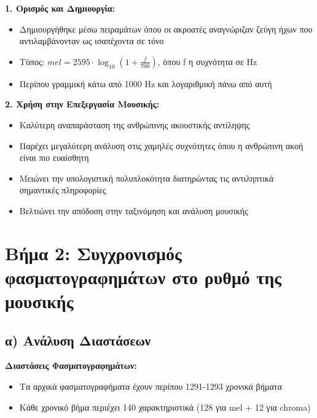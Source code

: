 \documentclass[a4paper,12pt]{article}
\begin{document}
\textbf{1. Ορισμός και Δημιουργία:}
\begin{itemize}
    \item Δημιουργήθηκε μέσω πειραμάτων όπου οι ακροατές αναγνώριζαν ζεύγη ήχων που αντιλαμβάνονταν ως ισαπέχοντα σε τόνο
    \item Τύπος: $mel = 2595 \cdot \log_{10}(1 + \frac{f}{700})$, όπου f η συχνότητα σε Hz
    \item Περίπου γραμμική κάτω από 1000 Hz και λογαριθμική πάνω από αυτή
\end{itemize}

\textbf{2. Χρήση στην Επεξεργασία Μουσικής:}
\begin{itemize}
    \item Καλύτερη αναπαράσταση της ανθρώπινης ακουστικής αντίληψης
    \item Παρέχει μεγαλύτερη ανάλυση στις χαμηλές συχνότητες όπου η ανθρώπινη ακοή είναι πιο ευαίσθητη
    \item Μειώνει την υπολογιστική πολυπλοκότητα διατηρώντας τις αντιληπτικά σημαντικές πληροφορίες
    \item Βελτιώνει την απόδοση στην ταξινόμηση και ανάλυση μουσικής
\end{itemize}

\section*{Βήμα 2: Συγχρονισμός φασματογραφημάτων στο ρυθμό της μουσικής}

\subsection*{α) Ανάλυση Διαστάσεων}

\textbf{Διαστάσεις Φασματογραφημάτων:}
\begin{itemize}
    \item Τα αρχικά φασματογραφήματα έχουν περίπου 1291-1293 χρονικά βήματα
    \item Κάθε χρονικό βήμα περιέχει 140 χαρακτηριστικά (128 για mel + 12 για chroma)
\end{itemize}
\end{document}
